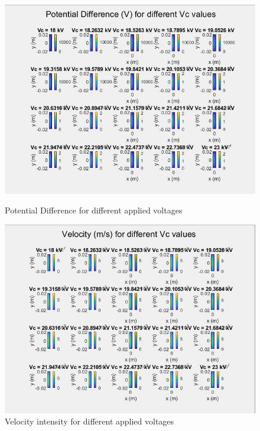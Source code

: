 \begin{figure}[ht]
	\centering
	\includegraphics[scale=0.8]{images/results images/matlab images/potential Difference.jpeg}
	\caption{Potential Difference for different applied voltages}
        \vspace*{\floatsep}
        
        	\centering
        	\includegraphics[scale=0.8]{images/results images/matlab images/velocity (2).jpeg}
        	\caption{Velocity intensity for different applied voltages }
        \end{figure}
        